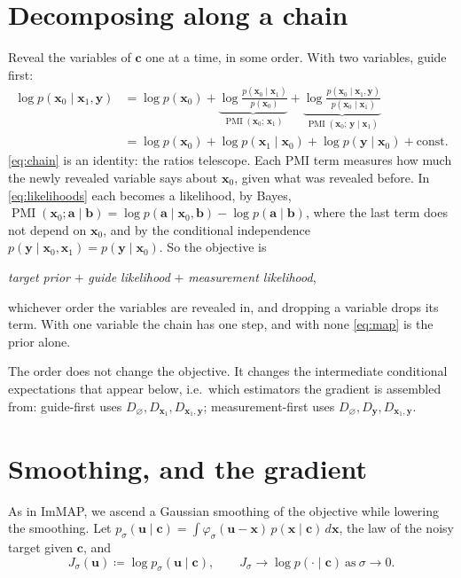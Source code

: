 \documentclass[11pt]{article}
\theoremstyle{remark}
\newcommand{\x}{\bm{x}}
\newcommand{\y}{\bm{y}}
\newcommand{\uu}{\bm{u}}
\newcommand{\cc}{\bm{c}}
\newcommand{\PMI}{\operatorname{PMI}}
\newcommand{\Dz}{D_{\varnothing}}
\newcommand{\Dg}{D_{\x_1}}
\newcommand{\Dy}{D_{\y}}
\newcommand{\Dgy}{D_{\x_1,\y}}
\begin{document}
\section{Decomposing along a chain}

Reveal the variables of $\cc$ one at a time, in some order. With two variables, guide first:
\begin{align}
  \log p(\x_0\mid\x_1,\y)
  &= \log p(\x_0)
   + \underbrace{\log\frac{p(\x_0\mid\x_1)}{p(\x_0)}}_{\PMI(\x_0;\,\x_1)}
   + \underbrace{\log\frac{p(\x_0\mid\x_1,\y)}{p(\x_0\mid\x_1)}}_{\PMI(\x_0;\,\y\mid\x_1)}
  \label{eq:chain}\\
  &= \log p(\x_0) + \log p(\x_1\mid\x_0) + \log p(\y\mid\x_0) + \mathrm{const}.
  \label{eq:likelihoods}
\end{align}
\eqref{eq:chain} is an identity: the ratios telescope. Each PMI term measures how much the
newly revealed variable says about $\x_0$, given what was revealed before. In
\eqref{eq:likelihoods} each becomes a likelihood, by Bayes,
$\PMI(\x_0;\bm a\mid\bm b) = \log p(\bm a\mid\x_0,\bm b) - \log p(\bm a\mid\bm b)$, where the
last term does not depend on $\x_0$, and by the conditional independence
$p(\y\mid\x_0,\x_1) = p(\y\mid\x_0)$. So the objective is
\begin{center}
  \emph{target prior} $+$ \emph{guide likelihood} $+$ \emph{measurement likelihood},
\end{center}
whichever order the variables are revealed in, and dropping a variable drops its term. With
one variable the chain has one step, and with none \eqref{eq:map} is the prior alone.

The order does not change the objective. It changes the intermediate conditional
expectations that appear below, i.e.\ which estimators the gradient is assembled from:
guide-first uses $\Dz,\Dg,\Dgy$; measurement-first uses $\Dz,\Dy,\Dgy$.

\section{Smoothing, and the gradient}

As in ImMAP, we ascend a Gaussian smoothing of the objective while lowering the smoothing. Let
$p_\sigma(\uu\mid\cc) = \int\varphi_\sigma(\uu-\x)\,p(\x\mid\cc)\,d\x$, the law of the noisy
target given $\cc$, and
\[
  J_\sigma(\uu) \coloneqq \log p_\sigma(\uu\mid\cc),\qquad J_\sigma\to\log p(\cdot\mid\cc)
  \ \text{as}\ \sigma\to0 .
\]
\end{document}
